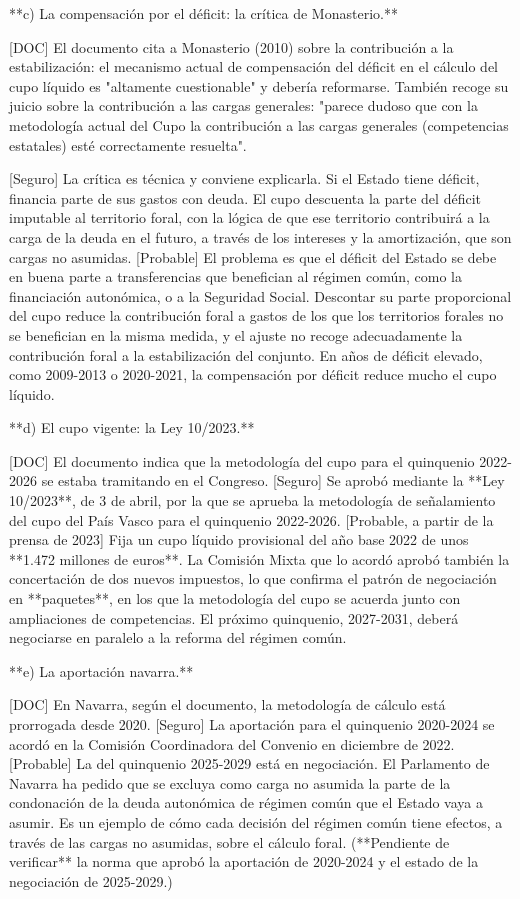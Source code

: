 \documentclass[10pt,a4paper]{article}
\begin{document}
**c) La compensación por el déficit: la crítica de Monasterio.**

[DOC] El documento cita a Monasterio (2010) sobre la contribución a la estabilización: el mecanismo actual de compensación del déficit en el cálculo del cupo líquido es "altamente cuestionable" y debería reformarse. También recoge su juicio sobre la contribución a las cargas generales: "parece dudoso que con la metodología actual del Cupo la contribución a las cargas generales (competencias estatales) esté correctamente resuelta".

[Seguro] La crítica es técnica y conviene explicarla. Si el Estado tiene déficit, financia parte de sus gastos con deuda. El cupo descuenta la parte del déficit imputable al territorio foral, con la lógica de que ese territorio contribuirá a la carga de la deuda en el futuro, a través de los intereses y la amortización, que son cargas no asumidas. [Probable] El problema es que el déficit del Estado se debe en buena parte a transferencias que benefician al régimen común, como la financiación autonómica, o a la Seguridad Social. Descontar su parte proporcional del cupo reduce la contribución foral a gastos de los que los territorios forales no se benefician en la misma medida, y el ajuste no recoge adecuadamente la contribución foral a la estabilización del conjunto. En años de déficit elevado, como 2009-2013 o 2020-2021, la compensación por déficit reduce mucho el cupo líquido.

**d) El cupo vigente: la Ley 10/2023.**

[DOC] El documento indica que la metodología del cupo para el quinquenio 2022-2026 se estaba tramitando en el Congreso. [Seguro] Se aprobó mediante la **Ley 10/2023**, de 3 de abril, por la que se aprueba la metodología de señalamiento del cupo del País Vasco para el quinquenio 2022-2026. [Probable, a partir de la prensa de 2023] Fija un cupo líquido provisional del año base 2022 de unos **1.472 millones de euros**. La Comisión Mixta que lo acordó aprobó también la concertación de dos nuevos impuestos, lo que confirma el patrón de negociación en **paquetes**, en los que la metodología del cupo se acuerda junto con ampliaciones de competencias. El próximo quinquenio, 2027-2031, deberá negociarse en paralelo a la reforma del régimen común.

**e) La aportación navarra.**

[DOC] En Navarra, según el documento, la metodología de cálculo está prorrogada desde 2020. [Seguro] La aportación para el quinquenio 2020-2024 se acordó en la Comisión Coordinadora del Convenio en diciembre de 2022. [Probable] La del quinquenio 2025-2029 está en negociación. El Parlamento de Navarra ha pedido que se excluya como carga no asumida la parte de la condonación de la deuda autonómica de régimen común que el Estado vaya a asumir. Es un ejemplo de cómo cada decisión del régimen común tiene efectos, a través de las cargas no asumidas, sobre el cálculo foral. (**Pendiente de verificar** la norma que aprobó la aportación de 2020-2024 y el estado de la negociación de 2025-2029.)
\end{document}
